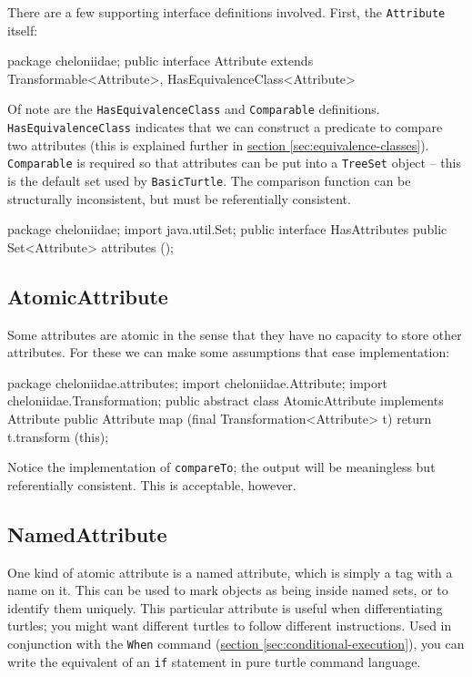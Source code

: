\documentclass{report}
\newcommand{\Ref}[2]{\hyperref[#2]{#1 \ref*{#2}}}
\begin{document}
      There are a few supporting interface definitions involved. First, the {\tt Attribute} itself:

\begin{javacode}
package cheloniidae;
public interface Attribute
         extends Transformable<Attribute>, HasEquivalenceClass<Attribute> {}
\end{javacode}

      Of note are the {\tt HasEquivalenceClass} and {\tt Comparable} definitions. {\tt HasEquivalenceClass} indicates that we can construct a predicate to
      compare two attributes (this is explained further in \Ref{section}{sec:equivalence-classes}). {\tt Comparable} is required so that attributes can be put
      into a {\tt TreeSet} object -- this is the default set used by {\tt BasicTurtle}. The comparison function can be structurally inconsistent, but must be
      referentially consistent.

\begin{javacode}
package cheloniidae;
import java.util.Set;
public interface HasAttributes {
  public Set<Attribute> attributes ();
}
\end{javacode}

\subsection {AtomicAttribute} \label{sec:atomicattribute}
        Some attributes are atomic in the sense that they have no capacity to store other attributes. For these we can make some assumptions that ease
        implementation:

\begin{javacode}
package cheloniidae.attributes;
import cheloniidae.Attribute;
import cheloniidae.Transformation;
public abstract class AtomicAttribute implements Attribute {
  public Attribute map (final Transformation<Attribute> t) {return t.transform (this);}
}
\end{javacode}

        Notice the implementation of {\tt compareTo}; the output will be meaningless but referentially consistent. This is acceptable, however.

\subsection {NamedAttribute} \label{sec:namedattribute}
        One kind of atomic attribute is a named attribute, which is simply a tag with a name on it. This can be used to mark objects as being inside named sets,
        or to identify them uniquely. This particular attribute is useful when differentiating turtles; you might want different turtles to follow different
        instructions. Used in conjunction with the {\tt When} command (\Ref{section}{sec:conditional-execution}), you can write the equivalent of an {\tt if}
        statement in pure turtle command language.
\end{document}
